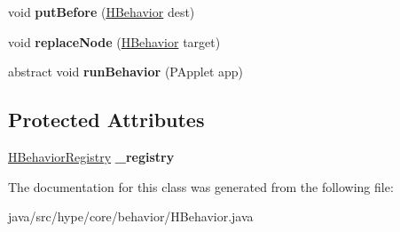 \begin{DoxyCompactItemize}
\item 
\hypertarget{classhype_1_1core_1_1behavior_1_1_h_behavior_a7c61b5628f51d36eb27a8a34edde41cf}{void {\bfseries put\-Before} (\hyperlink{classhype_1_1core_1_1behavior_1_1_h_behavior}{H\-Behavior} dest)}\label{classhype_1_1core_1_1behavior_1_1_h_behavior_a7c61b5628f51d36eb27a8a34edde41cf}

\item 
\hypertarget{classhype_1_1core_1_1behavior_1_1_h_behavior_a6c33a17493fa1b4aa3592fdbb36cb9f1}{void {\bfseries replace\-Node} (\hyperlink{classhype_1_1core_1_1behavior_1_1_h_behavior}{H\-Behavior} target)}\label{classhype_1_1core_1_1behavior_1_1_h_behavior_a6c33a17493fa1b4aa3592fdbb36cb9f1}

\item 
\hypertarget{classhype_1_1core_1_1behavior_1_1_h_behavior_ae2c4b6bdbe6422f0684247162d55782e}{abstract void {\bfseries run\-Behavior} (P\-Applet app)}\label{classhype_1_1core_1_1behavior_1_1_h_behavior_ae2c4b6bdbe6422f0684247162d55782e}

\end{DoxyCompactItemize}
\subsection*{Protected Attributes}
\begin{DoxyCompactItemize}
\item 
\hypertarget{classhype_1_1core_1_1behavior_1_1_h_behavior_a75eff7e938caf70a6771c91755a9d7e9}{\hyperlink{classhype_1_1core_1_1behavior_1_1_h_behavior_registry}{H\-Behavior\-Registry} {\bfseries \-\_\-registry}}\label{classhype_1_1core_1_1behavior_1_1_h_behavior_a75eff7e938caf70a6771c91755a9d7e9}

\end{DoxyCompactItemize}


The documentation for this class was generated from the following file\-:\begin{DoxyCompactItemize}
\item 
java/src/hype/core/behavior/H\-Behavior.\-java\end{DoxyCompactItemize}
